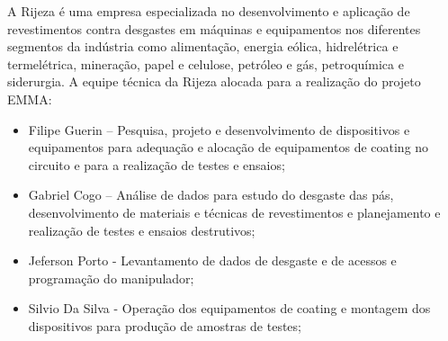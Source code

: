 A Rijeza é uma empresa especializada no desenvolvimento e aplicação de
revestimentos contra desgastes em máquinas e equipamentos nos diferentes
segmentos da indústria como alimentação, energia eólica, hidrelétrica e
termelétrica, mineração, papel e celulose, petróleo e gás, petroquímica e siderurgia.
A equipe técnica da Rijeza alocada para a realização do projeto EMMA:

\begin{itemize}
  \item Filipe Guerin – Pesquisa, projeto e desenvolvimento de dispositivos e
  equipamentos para adequação e alocação de equipamentos de coating no circuito
  e para a realização de testes e ensaios;
  \item Gabriel Cogo – Análise de dados para estudo do desgaste das pás,
  desenvolvimento de materiais e técnicas de revestimentos e planejamento e
  realização de testes e ensaios destrutivos;
  \item Jeferson Porto - Levantamento de dados de desgaste e de acessos e
  programação do manipulador;
  \item Silvio Da Silva - Operação dos equipamentos de coating e montagem dos
  dispositivos para produção de amostras de testes;
\end{itemize}


















    
    
  
